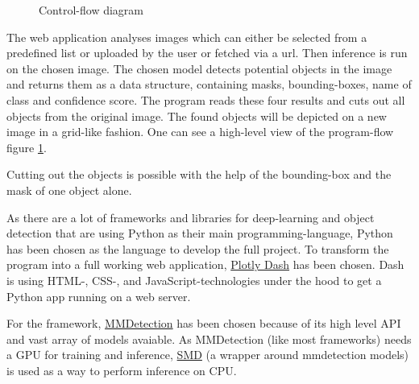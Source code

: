 \documentclass[a4paper,10pt,hidelinks]{scrartcl}
\newcommand{\imgref}[1]{{figure \ref{#1}}}
\begin{document}
\begin{figure}
	\caption{\label{fig:control-flow} Control-flow diagram}
\end{figure}

The web application analyses images which can either be selected from a predefined list or uploaded by the user or fetched via a url. Then inference is run on the chosen image. The chosen model detects potential objects in the image and returns them as a data structure, containing masks, bounding-boxes, name of class and confidence score. \newline The program reads these four results and cuts out all objects from the original image. The found objects will be depicted on a new image in a grid-like fashion. One can see a high-level view of the program-flow \imgref{fig:control-flow}.

Cutting out the objects is possible with the help of the bounding-box and the mask of one object alone.

As there are a lot of frameworks and libraries for deep-learning and object detection that are using Python as their main programming-language, Python has been chosen as the language to develop the full project. To transform the program into a full working web application, \href{https://dash.plotly.com}{Plotly Dash} has been chosen. Dash is using HTML-, CSS-, and JavaScript-technologies under the hood to get a Python app running on a web server.

For the framework, \href{https://github.com/open-mmlab/mmdetection/}{MMDetection} has been chosen because of its high level API and vast array of models avaiable. As MMDetection (like most frameworks) needs a GPU for training and inference, \href{https://github.com/akarazniewicz/smd}{SMD} (a wrapper around mmdetection models) is used as a way to perform inference on CPU.
\end{document}
